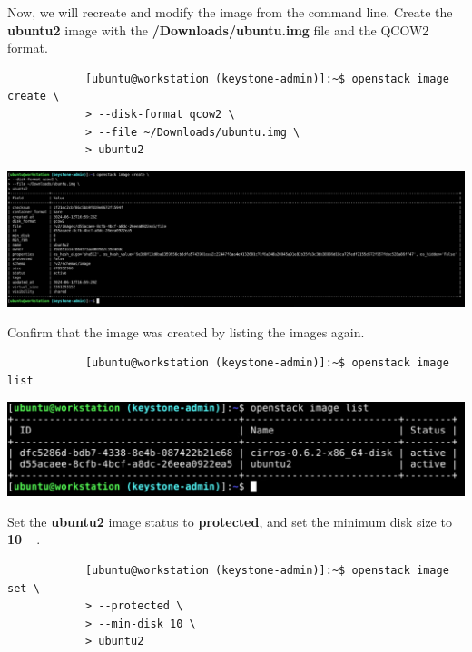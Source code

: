 \documentclass[letterpaper, 12pt]{article}
\begin{document}
\begin{enumerate}
    \begin{labstep}
        Now, we will recreate and modify the image from the command line.
        Create the \textbf{ubuntu2} image with the \textbf{\texttildemid/Downloads/ubuntu.img} file and the QCOW2 format.
        \begin{lstlisting}
            [ubuntu@workstation (keystone-admin)]:~$ openstack image create \
            > --disk-format qcow2 \
            > --file ~/Downloads/ubuntu.img \
            > ubuntu2
        \end{lstlisting}

        \begin{center}
            \includegraphics[width=\linewidth]{images/part1/step19.png}
        \end{center}
    \end{labstep}

    \begin{labstep}
        Confirm that the image was created by listing the images again.
        \begin{lstlisting}
            [ubuntu@workstation (keystone-admin)]:~$ openstack image list
        \end{lstlisting}

        \begin{center}
            \includegraphics[width=\linewidth]{images/part1/step20.png}
        \end{center}
    \end{labstep}

    \begin{labstep}
        Set the \textbf{ubuntu2} image status to \textbf{protected}, and set the minimum disk size to \textbf{\qty{10}{\giga\byte}}.
        \begin{lstlisting}
            [ubuntu@workstation (keystone-admin)]:~$ openstack image set \
            > --protected \
            > --min-disk 10 \
            > ubuntu2
        \end{lstlisting}


\end{labstep}
\end{enumerate}
\end{document}
